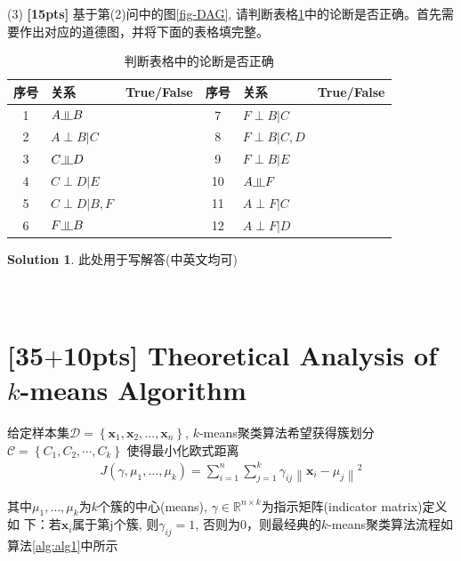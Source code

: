 \documentclass[a4paper,UTF8]{article}
\theoremstyle{definition}
\newtheorem*{solution}{Solution}
\newcommand{\indep}{\rotatebox[origin=c]{90}{$\models$}}
\begin{document}
(3) \textbf{[15pts]} 基于第(2)问中的图\ref{fig-DAG}, 请判断表格\ref{table:DAG}中的论断是否正确。首先需要作出对应的道德图，并将下面的表格填完整。
\begin{table}[h]
\centering
\caption{判断表格中的论断是否正确}
\label{table:DAG}
\begin{tabular}{c|l|c||c|l|c}\hline
序号   		& 		关系  			& True/False 	& 序号   	& 		关系  			& True/False \\ \hline
1			&	$A \indep B$ 		    & 			    & 7  		& 	$F \perp B|C$ 		& 			 \\
2			&	$A \perp B|C$ 	    & 			    & 8  		& 	$F \perp B|C, D$ 	& 			 \\
3			&	$C \indep D $		    & 			    & 9  		& 	$F \perp B|E$ 		& 			 \\
4			&	$C \perp D|E$ 	    & 			    & 10  		& 	$A \indep F $			& 			 \\
5			&	$C \perp D|B, F$     & 			    & 11  		& 	$A \perp F|C$ 		& 			 \\
6			&	$F \indep B $		    & 			    & 12  		& 	$A \perp F|D$ 		& 			 \\ \hline
\end{tabular}
\end{table}

\begin{solution}
此处用于写解答(中英文均可)
~\\
~\\
~\\
\end{solution}



\section{\textbf{[35$+$10pts]} Theoretical Analysis of $k$-means Algorithm}
给定样本集$\mathcal{D}=\left\{\mathbf{x}_{1}, \mathbf{x}_{2}, \ldots, \mathbf{x}_{n}\right\}$, $k$-means聚类算法希望获得簇划分$\mathcal{C}=\left\{C_{1}, C_{2}, \cdots, C_{k}\right\}$
使得最小化欧式距离
\begin{align} \label{eq1}
J\left(\gamma, \mu_{1}, \ldots, \mu_{k}\right)=\sum_{i=1}^{n} \sum_{j=1}^{k} \gamma_{i j}\left\|\mathbf{x}_{i}-\mu_{j}\right\|^{2}
\end{align}

其中$\mu_{1}, \ldots, \mu_{k}$为$k$个簇的中心(means), 
 $\gamma \in \mathbb{R}^{n \times k}$为指示矩阵(indicator matrix)定义如
下：若$\mathbf{x}_{i}$属于第j个簇, 则$\gamma_{i j}=1$, 否则为0，则最经典的$k$-means聚类算法流程如算法\ref{alg:alg1}中所示
\end{document}
